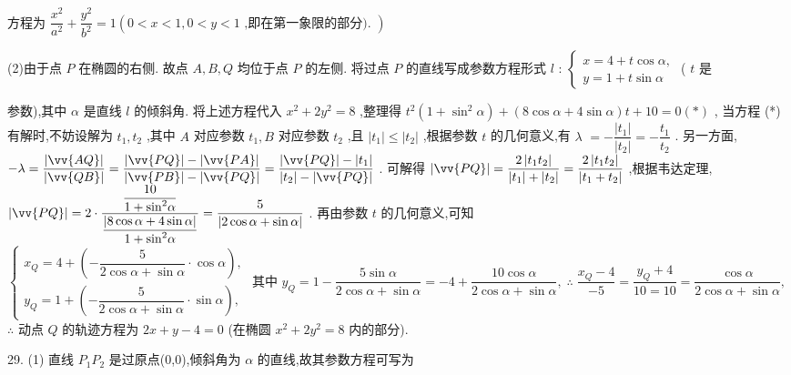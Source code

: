 方程为 $\dfrac{{x}^{2}}{{a}^{2}} + \dfrac{{y}^{2}}{{b}^{2}} = 1\left( {0 < x < 1,0 < y < 1\text{ ,即在第一象限的部分). }}\right)$

(2)由于点 $P$ 在椭圆的右侧. 故点 $A,B,Q$ 均位于点 $P$ 的左侧. 将过点 $P$ 的直线写成参数方程形式 $l$ : $\left\{  \begin{array}{l} x = 4 + t\cos \alpha , \\  y = 1 + t\sin \alpha  \end{array}\right.$ ( $t$ 是

参数),其中 $\alpha$ 是直线 $l$ 的倾斜角. 将上述方程代入 ${x}^{2} + 2{y}^{2} = 8$ ,整理得 ${t}^{2}\left( {1 + {\sin }^{2}\alpha }\right)  + \left( {8\cos \alpha  + 4\sin \alpha }\right) t + {10} = 0\left( *\right)$ , 当方程 (*) 有解时,不妨设解为 ${t}_{1},{t}_{2}$ ,其中 $A$ 对应参数 ${t}_{1},B$ 对应参数 ${t}_{2}$ ,且 $\left| {t}_{1}\right|  \leq  \left| {t}_{2}\right|$ ,根据参数 $t$ 的几何意义,有 $\lambda$  $=  - \dfrac{\left| {t}_{1}\right| }{\left| {t}_{2}\right| } =  - \dfrac{{t}_{1}}{{t}_{2}}$ . 另一方面, $- \lambda  = \dfrac{\left| \vv{AQ}\right| }{\left| \vv{QB}\right| } = \dfrac{\left| \vv{PQ}\right|  - \left| \vv{PA}\right| }{\left| \vv{PB}\right|  - \left| \vv{PQ}\right| } = \dfrac{\left| \vv{PQ}\right|  - \left| {t}_{1}\right| }{\left| {t}_{2}\right|  - \left| \vv{PQ}\right| }$ . 可解得 $\left| \vv{PQ}\right|  = \dfrac{2\left| {{t}_{1}{t}_{2}}\right| }{\left| {t}_{1}\right|  + \left| {t}_{2}\right| } = \dfrac{2\left| {{t}_{1}{t}_{2}}\right| }{\left| {{t}_{1} + {t}_{2}}\right| }$ ,根据韦达定理, $\left| \vv{PQ}\right|  = 2 \cdot  \dfrac{\dfrac{10}{1 + {\sin }^{2}\alpha }}{\dfrac{\left| 8\cos \alpha  + 4\sin \alpha \right| }{1 + {\sin }^{2}\alpha }} = \dfrac{5}{\left| 2\cos \alpha  + \sin \alpha \right| }$ . 再由参数 $t$ 的几何意义,可知 $\left\{  {\begin{array}{l} {x}_{Q} = 4 + \left( {-\dfrac{5}{2\cos \alpha  + \sin \alpha } \cdot  \cos \alpha }\right) , \\  {y}_{Q} = 1 + \left( {-\dfrac{5}{2\cos \alpha  + \sin \alpha } \cdot  \sin \alpha }\right) , \end{array}\text{ 其中 }{y}_{Q} = 1 - \dfrac{5\sin \alpha }{2\cos \alpha  + \sin \alpha } =  - 4 + \dfrac{{10}\cos \alpha }{2\cos \alpha  + \sin \alpha },\;\therefore \;\dfrac{{x}_{Q} - 4}{-5} = \dfrac{{y}_{Q} + 4}{{10} = {10}} = \dfrac{\cos \alpha }{2\cos \alpha  + \sin \alpha },}\right.$  $\therefore$ 动点 $Q$ 的轨迹方程为 ${2x} + y - 4 = 0$ (在椭圆 ${x}^{2} + 2{y}^{2} = 8$ 内的部分).

29. (1) 直线 ${P}_{1}{P}_{2}$ 是过原点(0,0),倾斜角为 $\alpha$ 的直线,故其参数方程可写为

